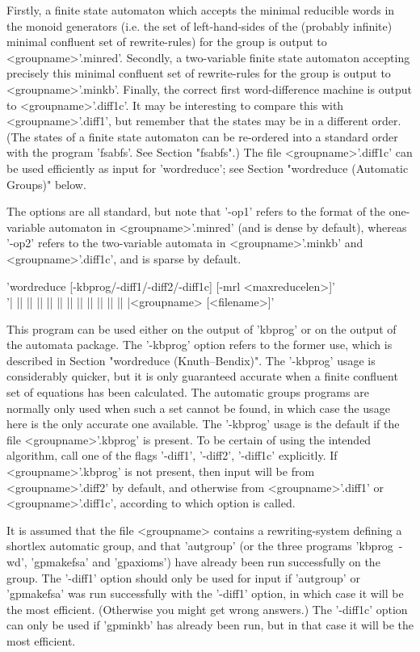 Firstly, a finite state automaton which accepts the
minimal reducible words in the monoid generators (i.e. the set of
left-hand-sides  of the (probably infinite) minimal confluent set of
rewrite-rules) for the group is output to <groupname>'.minred'.
Secondly, a two-variable finite state automaton accepting precisely
this minimal confluent set of rewrite-rules
for the group is output to <groupname>'.minkb'.
Finally, the correct first word-difference machine is output to
<groupname>'.diff1c'. It may be interesting to compare this with
<groupname>'.diff1', but remember that the states may be in a different
order. (The states of a finite state automaton can be re-ordered into a
standard order with the program 'fsabfs'. See Section "fsabfs".)
The file <groupname>'.diff1c' can be used efficiently as input for
'wordreduce'; see Section "wordreduce (Automatic Groups)" below.

The options are all standard, but note that '-op1' refers to the format
of the one-variable automaton in <groupname>'.minred' (and is dense by
default), whereas '-op2' refers to the two-variable automata in
<groupname>'.minkb' and <groupname>'.diff1c', and is sparse by default.

'wordreduce  [-kbprog/-diff1/-diff2/-diff1c] [-mrl <maxreducelen>]'\\
'| || || || || || || || || || || || |<groupname> [<filename>]'

This program can be used either on the output of 'kbprog' or on the output
of the automata package. The '-kbprog' option refers to the former use,
which is described in Section "wordreduce (Knuth--Bendix)".
The '-kbprog' usage is considerably quicker, but it is only guaranteed
accurate when a finite confluent set of equations has been calculated. 
The automatic groups programs are normally only used when such a set
cannot be found, in which case the usage here is the only
accurate one available.
The '-kbprog' usage is the default if the file <groupname>'.kbprog' is present.
To be certain of using the intended algorithm, call one of the flags
'-diff1', '-diff2', '-diff1c' explicitly.
If <groupname>'.kbprog' is not present, then input will be from
<groupname>'.diff2' by default, and otherwise from <groupname>'.diff1'
or <groupname>'.diff1c', according to which option is called.

It is assumed that the file <groupname> contains a rewriting-system
defining a shortlex automatic group,
and that 'autgroup' (or the three programs 'kbprog\ -wd', 'gpmakefsa'
and 'gpaxioms') have already been run successfully on the group.
The '-diff1' option should only be used for input if  'autgroup' or
'gpmakefsa' was run successfully with the '-diff1' option, in which
case it will be the most efficient. (Otherwise you might get wrong answers.)
The  '-diff1c' option can only be used if 'gpminkb' has already been run,
but in that case it will be the most efficient.

